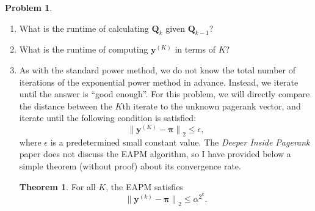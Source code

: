 \documentclass[10pt]{exam}
\theoremstyle{definition}
\newtheorem{problem}{Problem}
\newtheorem{theorem}{Theorem}
\newcommand{\Q}{\mathbf Q}
\newcommand{\p}{\mathbf P}
\newcommand{\pb}{\bar {\p}}
\newcommand{\pbb}{\bar {\pb}}
\newcommand{\pr}{\bm \pi}
\newcommand{\x}{\mathbf x}
\newcommand{\y}{\mathbf y}
\newcommand{\ltwo}[1]{{\lVert {#1} \rVert}_2}
\begin{document}
\begin{problem}
    \begin{enumerate}
%

        \newpage
        \item
            What is the runtime of calculating $\Q_k$ given $\Q_{k-1}$? 
            \vspace{4in}

        \item 
            What is the runtime of computing $\y^{(K)}$ in terms of $K$?
            \vspace{3in}

        \newpage
        \item
            As with the standard power method, we do not know the total number of iterations of the exponential power method in advance.
            Instead, we iterate until the answer is ``good enough''.
            For this problem, we will directly compare the distance between the $K$th iterate to the unknown pagerank vector,
            and iterate until the following condition is satisfied:
            \begin{equation}
                \label{eq:exp:eps}
                \ltwo{\y^{(K)}-\pr} \le \epsilon,
            \end{equation}
            where $\epsilon$ is a predetermined small constant value.
            The \emph{Deeper Inside Pagerank} paper does not discuss the EAPM algorithm, so I have provided below a simple theorem (without proof) about its convergence rate.
            \begin{theorem}
                \label{thm:EAPM}
                For all $K$, the EAPM satisfies
                \begin{equation}
                    \ltwo{\y^{(k)}-\pr} \le \alpha^{2^k}.
                \end{equation}
            \end{theorem}


\end{enumerate}
\end{problem}
\end{document}

